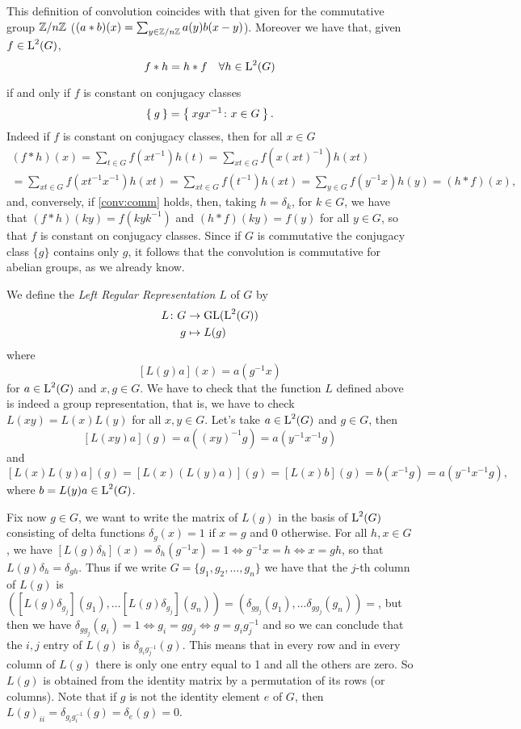 \begin{rem}
This definition of convolution coincides with that given for the commutative group ${\mathbb Z}/{n{\mathbb Z}}$ ($(a\ast b)(x)=\sum_{y \in {\mathbb Z}/{n{\mathbb Z}}} a(y)b(x-y)$). 
Moreover we have that, given $f\in \operatorname{L}^2(G)$,
\begin{equation}
\label{conv:comm}
f*h=h*f \quad \forall h \in \operatorname{L}^2(G)
\end{equation}

if and only if $f$ is constant on conjugacy classes
\[
\Set{g}=\Set{xgx^{-1}\colon x\in G}.
\]
Indeed if $f$ is constant on conjugacy classes, then for all $x\in G$
\begin{multline*}
(f\ast h)(x) =\sum_{t \in G} f(xt^{-1})h(t)=\sum_{xt \in G} f(x(xt)^{-1})h(xt)\\
=\sum_{xt \in G} f(xt^{-1}x^{-1})h(xt)
=\sum_{xt \in G} f(t^{-1})h(xt)
=\sum_{y \in G} f(y^{-1}x)h(y)= (h*f)(x),
\end{multline*}
and, conversely, if \ref{conv:comm} holds, then, taking $h=\delta_k$, for $k\in G$, we have that $(f\ast h)(ky)=f(kyk^{-1})$ and $(h*f)(ky)=f(y)$ for all $y \in G$, so that $f$ is constant on conjugacy classes.
Since if $G$ is commutative the conjugacy class $\{g\}$ contains only $g$, it follows that the convolution is commutative for abelian groups, as we already know.
\end{rem}
\begin{exmp}
\label{exa:lrr}
We define the \emph{Left Regular Representation} $L$ of $G$ by 
\begin{align*}
L\colon G &\rightarrow \operatorname{GL}(\operatorname{L}^2(G))\\
	 g&\mapsto L(g) 
\end{align*}
where 
\[
[L(g)a](x)=a(g^{-1}x)
\]
for $a \in \operatorname{L}^2(G)$ and $x,g \in G$.
We have to check that the function $L$ defined above is indeed a group representation, that is, we have to check $L(xy)=L(x)L(y)$ for all $x,y \in G$. Let's take $a \in \operatorname{L}^2(G)$ and $g\in G$, then
\[ [L(xy)a](g)=a((xy)^{-1}g)=a(y^{-1}x^{-1}g)
\]
and
\[
[L(x) L(y)a](g)=[L(x)(L(y)a)](g)=[L(x)b](g)=b(x^{-1}g)=a(y^{-1}x^{-1}g),
\]
where $b=L(y)a \in \operatorname{L}^2(G)$.

Fix now $g\in G$, we want to write the matrix of $L(g)$ in the basis of $\operatorname{L}^2(G)$ consisting of delta functions $\delta_g(x)=1$ if $x=g$ and 0 otherwise. For all $h,x\in G$, we have $[L(g)\delta_h](x)=\delta_h(g^{-1}x)=1 \iff g^{-1}x=h \iff x=gh$, so that $L(g)\delta_h=\delta_{gh}$. Thus if we write $G=\{g_1,g_2,\dots , g_n\}$ we have that the $j$-th column of $L(g)$ is $([L(g)\delta_{g_j}](g_1),\dots [L(g)\delta_{g_j}](g_n))=(\delta_{gg_j}(g_1),\dots \delta_{gg_j}(g_n))=$, but then we have $\delta_{gg_j}(g_i)=1\iff g_i=gg_j\iff g=g_ig_j^{-1}$ and so we can conclude that the $i,j$ entry of $L(g)$ is $\delta_{g_ig_j^{-1}}(g)$. This means that in every row and in every column of $L(g)$ there is only one entry equal to 1 and all the others are zero. So $L(g)$ is obtained from the identity matrix by a permutation of its rows (or columns). Note that if $g$ is not the identity element $e$ of $G$, then $L(g)_{ii}=\delta_{g_ig_i^{-1}}(g)=\delta_{e}(g)=0$.
\end{exmp}

